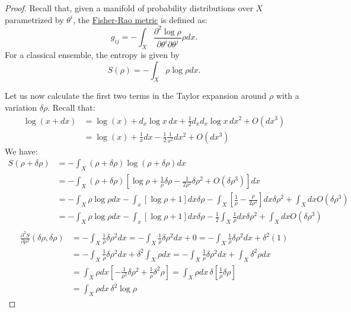 \begin{proof}
	Recall that, given a manifold of probability distributions over $X$ parametrized by $\theta^i$, the \href{https://en.wikipedia.org/wiki/Fisher_information_metric}{Fisher-Rao metric} is defined as:
	\begin{equation}
		g_{ij} =- \int_X \frac{\partial^2 \log \rho}{\partial \theta^i \partial \theta^j} \rho dx.
	\end{equation}
	For a classical ensemble, the entropy is given by
	\begin{equation}
		S(\rho) =- \int_X \rho \log \rho dx.
	\end{equation}
	
	Let us now calculate the first two terms in the Taylor expansion around $\rho$ with a variation $\delta\rho$. Recall that:
	\begin{equation}
		\begin{aligned}
		\log(x+dx) &= \log(x) + d_x \log x \, dx + \frac{1}{2} d_x d_x  \log x \, dx^2 + O(dx^3) \\
		&= \log(x) + \frac{1}{x} dx - \frac{1}{2} \frac{1}{x^2} dx^2 + O(dx^3)
		\end{aligned}
	\end{equation}
	We have:
	\begin{equation}
		\begin{aligned}
			S(\rho + \delta \rho) &= -\int_X (\rho + \delta \rho) \log (\rho + \delta \rho) dx \\
			&=-\int_X (\rho + \delta \rho) \left[\log \rho + \frac{1}{\rho} \delta \rho - \frac{1}{2\rho^2} \delta \rho^2 + O(\delta \rho^3)\right] dx \\
			&= - \int_X \rho \log \rho dx - \int_x \left[\log \rho + 1 \right]dx \delta \rho -\int_X \left[\frac{1}{\rho} - \frac{\rho}{2\rho^2}\right] dx \delta \rho^2 + \int_X dx O(\delta\rho^3) \\
			&= - \int_X \rho \log \rho dx - \int_x \left[\log \rho + 1 \right]dx \delta \rho - 	
			\frac{1}{2}\int_X \frac{1}{\rho} dx \delta \rho^2 + \int_X dx O(\delta\rho^3) \\
		\end{aligned}
	\end{equation}
	\begin{equation}
		\begin{aligned}
						\frac{\partial^2 S}{\partial \rho^2}(\delta \rho, \delta \rho) &= -\int_X \frac{1}{\rho} \delta \rho^2 dx = -\int_X \frac{1}{\rho} \delta \rho^2 dx + 0 = -\int_X \frac{1}{\rho} \delta \rho^2 dx + \delta^2 (1) \\
			&= -\int_X \frac{1}{\rho} \delta \rho^2 dx + \delta^2 \int_X \rho dx = -\int_X \frac{1}{\rho} \delta \rho^2 dx + \int_X \delta^2 \rho dx \\
			&= \int_X \rho dx \left[-\frac{1}{\rho^2} \delta \rho^2 + \frac{1}{\rho} \delta^2 \rho \right]
			= \int_X \rho dx \, \delta \left[\frac{1}{\rho} \delta \rho \right] \\
			&= \int_X \rho dx \, \delta^2 \log \rho
		\end{aligned}
	\end{equation}
	

\end{proof}
